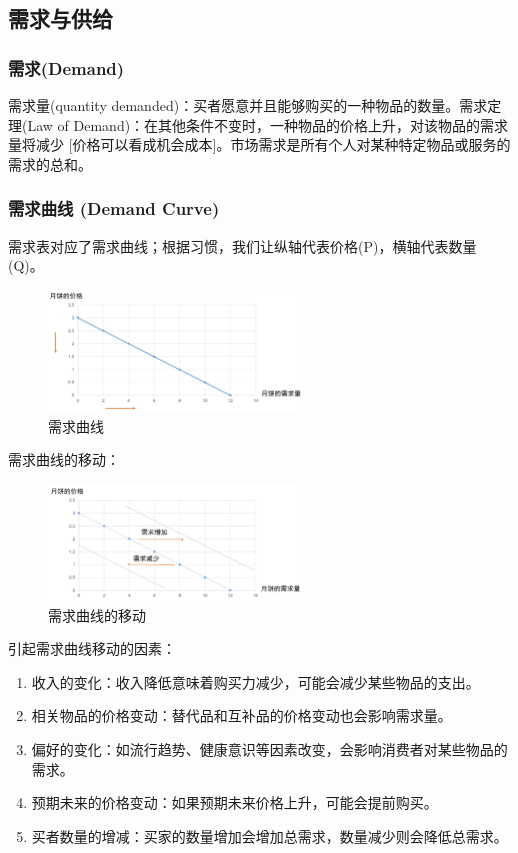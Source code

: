 \documentclass[12pt, a4paper]{article}
\begin{document}
\subsection{需求与供给}

\subsubsection{需求(Demand)}
需求量(quantity demanded)：买者愿意并且能够购买的一种物品的数量。需求定理(Law of Demand)：在其他条件不变时，一种物品的价格上升，对该物品的需求量将减少 [价格可以看成机会成本]。市场需求是所有个人对某种特定物品或服务的需求的总和。

\subsubsection{需求曲线 (Demand Curve)}
需求表对应了需求曲线；根据习惯，我们让纵轴代表价格(P)，横轴代表数量(Q)。

\begin{figure}[H]
  \centering
  \includegraphics[width=0.6\textwidth]{需求曲线.png}
  \caption{需求曲线}
\end{figure}

需求曲线的移动：

\begin{figure}[H]
  \centering
  \includegraphics[width=0.6\textwidth]{需求曲线的移动.png}
  \caption{需求曲线的移动}
\end{figure}

引起需求曲线移动的因素：
\begin{enumerate}
    \item 收入的变化：收入降低意味着购买力减少，可能会减少某些物品的支出。
    \item 相关物品的价格变动：替代品和互补品的价格变动也会影响需求量。
    \item 偏好的变化：如流行趋势、健康意识等因素改变，会影响消费者对某些物品的需求。
    \item 预期未来的价格变动：如果预期未来价格上升，可能会提前购买。
    \item 买者数量的增减：买家的数量增加会增加总需求，数量减少则会降低总需求。
\end{enumerate}
\end{document}

